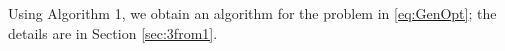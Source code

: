 \documentclass[twocolumn]{article}
\begin{document}

Using Algorithm 1, we obtain an algorithm for the problem in \eqref{eq:GenOpt};
the details are in Section \ref{sec:3from1}.
\end{document}
